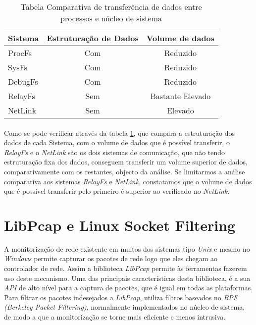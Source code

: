 \begin{table}[h]
\begin{center}

\begin{tabular}{|l||c|c|}
\hline
Sistema & Estruturação de Dados & Volume de dados \\
\hline
ProcFs & Com & Reduzido \\
\hline
SysFs & Com & Reduzido \\
\hline
DebugFs & Com & Reduzido \\
\hline
RelayFs & Sem & Bastante Elevado \\
\hline
NetLink & Sem & Elevado \\
\hline
\end{tabular}
\caption{Tabela Comparativa de transferência de dados entre processos e núcleo de sistema}
\label{tab:transf_compare}
\end{center}
\end{table}

\paragraph*{}
Como se pode verificar através da tabela \ref{tab:transf_compare}, que compara a estruturação dos dados de cada Sistema, com o volume de dados que é possível transferir, o \textit{RelayFs} e o \textit{NetLink} são os dois sistemas de comunicação, que não tendo estruturação fixa dos dados, conseguem transferir um volume superior de dados, comparativamente com os restantes, objecto da análise.
Se limitarmos a análise comparativa aos sistemas \textit{RelayFs} e \textit{NetLink}, constatamos que o volume de dados que é possível transferir pelo primeiro é superior ao verificado no \textit{NetLink}.

\section{LibPcap e Linux Socket Filtering}\label{sect:LibPcap}

A monitorização de rede existente em muitos dos sistemas tipo \textit{Unix} e mesmo no \textit{Windows} permite capturar os pacotes de rede logo que eles chegam ao controlador de rede.
Assim a biblioteca \textit{LibPcap}\cite{:LibPcap} permite às ferramentas fazerem uso deste mecanismo.
Uma das principais características desta biblioteca, é a sua \textit{API} de alto nível para a captura de pacotes, que é igual em todas as plataformas.
Para filtrar os pacotes indesejados a \textit{LibPcap}, utiliza filtros baseados no \textit{BPF (Berkeley Packet Filtering)}, normalmente implementados no núcleo de sistema, de modo a que a monitorização se torne mais eficiente e menos intrusiva.

